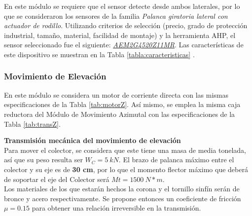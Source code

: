 En este módulo se requiere que el sensor detecte desde ambos laterales, por lo que se consideraron los sensores de la familia \textit{Palanca giratoria lateral con actuador de rodillo}. Utilizando criterios de selección (precio, grado de protección industrial, tamaño, material, facilidad de montaje) y la herramienta AHP, el sensor seleccionado fue el siguiente: \underline{\textit{AEM2G4520Z11MR}}. Las características de este dispositivo se muestran en la Tabla \ref{tabla:caracteristicas} \cite{DDA7}.

\subsubsection{Movimiento de Elevación}
En este módulo se considera un motor de corriente directa con las mismas especificaciones de la Tabla \ref{tab:motorZ}. Así mismo, se emplea la misma caja reductora del Módulo de Movimiento Azimutal con las especificaciones de la Tabla \ref{tab:transZ}.

\textbf{Transmisión mecánica del movimiento de elevación}\\

Para mover el colector, se considera que este tiene una masa de media tonelada, así que su peso resulta ser $ W_C=5\ kN $. El brazo de palanca máximo entre el colector y su eje es de \textbf{30 cm}, por lo que el momento flector máximo que deberá de soportar el eje del Colector será $ Mt=1500\ N*m $.\\

Los materiales de los que estarán hechos la corona y el tornillo sinfín serán de bronce y acero respectivamente. Se propone entonces un coeficiente de fricción $ \mu=0.15 $ para obtener una relación irreversible en la transmisión. \\

